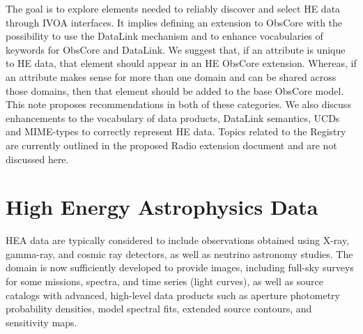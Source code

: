 \documentclass[11pt,a4paper]{ivoa}
\begin{document}
The goal is to explore elements needed to reliably discover and select \gls{HE} data through \gls{IVOA} interfaces. It implies defining an extension to ObsCore with the possibility to use the DataLink mechanism and to enhance vocabularies of keywords for ObsCore and DataLink. We suggest that, if an attribute is unique to \gls{HE} data, that element should appear in an \gls{HE} ObsCore extension. Whereas, if an attribute makes sense for more than one domain and can be shared across those domains, then that element should be added to the base ObsCore model. This note proposes recommendations in both of these categories. We also discuss enhancements to the vocabulary of data products, DataLink semantics, UCDs and MIME-types to correctly represent \gls{HE} data. Topics related to the Registry are currently outlined in the proposed Radio extension document and are not discussed here.


\section{High Energy Astrophysics Data}

HEA data are typically considered to include observations obtained using X-ray, gamma-ray, and cosmic ray detectors, as well as neutrino astronomy studies. The domain is now sufficiently developed to provide images, including full-sky surveys for some missions, spectra, and time series (light curves), as well as source catalogs with advanced, high-level data products such as aperture photometry probability densities, model spectral fits, extended source contours, and sensitivity maps.
\end{document}
